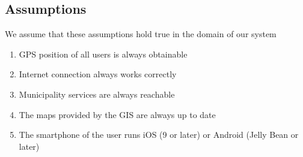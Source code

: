 \subsection{Assumptions}
	We assume that these assumptions hold true in the domain of our system 
	\begin{enumerate}[label=\textbf{	DA\arabic*}]
		\item GPS position of all users is always obtainable
		\item Internet connection always works correctly
		\item Municipality services are always reachable
		\item The maps provided by the GIS are always up to date
		\item The smartphone of the user runs iOS (9 or later) or Android (Jelly Bean or later)
	\end{enumerate}
		
\clearpage